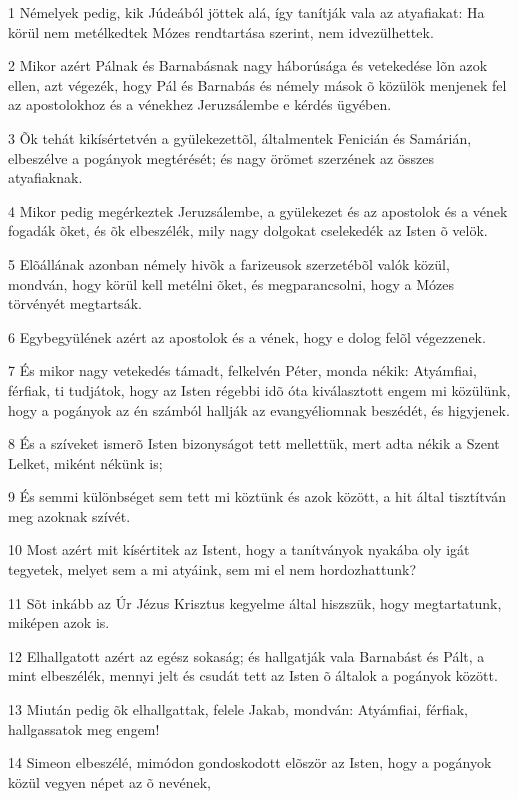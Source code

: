 \par 1 Némelyek pedig, kik Júdeából jöttek alá, így tanítják vala az atyafiakat: Ha körül nem metélkedtek Mózes rendtartása  szerint, nem idvezülhettek.
\par 2 Mikor azért Pálnak és Barnabásnak nagy háborúsága és vetekedése lõn azok ellen, azt végezék, hogy Pál és Barnabás és némely mások õ közülök menjenek fel az apostolokhoz és a vénekhez Jeruzsálembe e kérdés ügyében.
\par 3 Õk tehát kikísértetvén a gyülekezettõl, általmentek Fenicián és Samárián, elbeszélve a pogányok megtérését; és nagy örömet szerzének az összes atyafiaknak.
\par 4 Mikor pedig megérkeztek Jeruzsálembe, a gyülekezet és az apostolok és a vének fogadák õket, és õk elbeszélék, mily nagy dolgokat cselekedék az Isten õ velök.
\par 5 Elõállának azonban némely hivõk a farizeusok szerzetébõl valók közül, mondván, hogy körül kell metélni õket, és megparancsolni, hogy a Mózes törvényét megtartsák.
\par 6 Egybegyülének azért az apostolok és a vének, hogy e dolog felõl végezzenek.
\par 7 És mikor nagy vetekedés támadt, felkelvén Péter, monda nékik: Atyámfiai, férfiak, ti tudjátok, hogy az Isten régebbi idõ óta kiválasztott engem mi közülünk, hogy a pogányok az én számból hallják az evangyéliomnak beszédét, és higyjenek.
\par 8 És a szíveket ismerõ Isten bizonyságot tett mellettük, mert adta nékik a Szent Lelket, miként nékünk is;
\par 9 És semmi különbséget sem tett mi köztünk és azok között, a hit által tisztítván meg azoknak szívét.
\par 10 Most azért mit kísértitek az Istent, hogy a tanítványok nyakába oly igát tegyetek, melyet sem a mi atyáink, sem mi el nem hordozhattunk?
\par 11 Sõt inkább az Úr Jézus Krisztus kegyelme által hiszszük, hogy megtartatunk, miképen azok is.
\par 12 Elhallgatott azért az egész sokaság; és hallgatják vala Barnabást és Pált, a mint elbeszélék, mennyi jelt és csudát tett az Isten õ általok a pogányok között.
\par 13 Miután pedig õk elhallgattak, felele Jakab, mondván: Atyámfiai, férfiak, hallgassatok meg engem!
\par 14 Simeon elbeszélé, mimódon gondoskodott elõször az Isten, hogy a pogányok közül vegyen népet az õ nevének,
